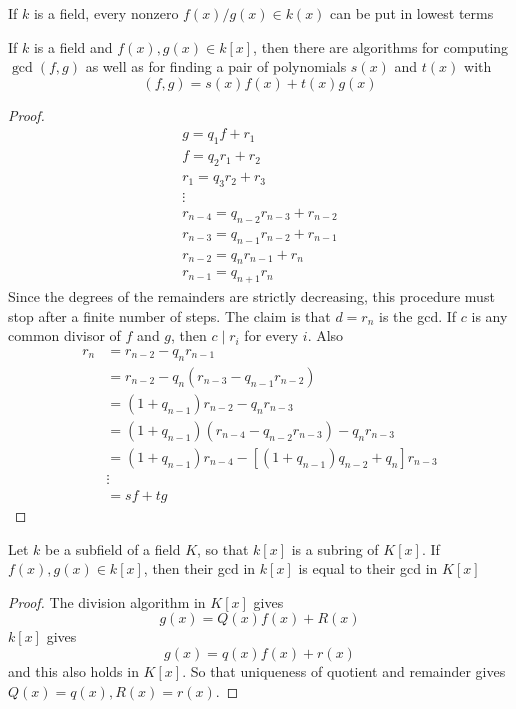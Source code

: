 \documentclass[11pt]{article}
\begin{document}
\begin{proposition}[]
If \(k\) is a field, every nonzero \(f(x)/g(x)\in k(x)\) can be put in lowest terms
\end{proposition}


\begin{theorem}
If \(k\) is a field and \(f(x),g(x)\in k[x]\), then there are algorithms for
computing \(\gcd(f,g)\) as well as for finding a pair of polynomials \(s(x)\)
and \(t(x)\) with 
\begin{equation*}
(f,g)=s(x)f(x)+t(x)g(x)
\end{equation*}
\end{theorem}

\begin{proof}
\begin{gather*}
g=q_1f+r_1\\
f=q_2r_1+r_2\\
r_1=q_3r_2+r_3\\
\vdots\\
r_{n-4}=q_{n-2}r_{n-3}+r_{n-2}\\
r_{n-3}=q_{n-1}r_{n-2}+r_{n-1}\\
r_{n-2}=q_nr_{n-1}+r_n\\
r_{n-1}=q_{n+1}r_n
\end{gather*}
Since the degrees of the remainders are strictly decreasing, this procedure
must stop after a finite number of steps. The claim is that \(d=r_n\) is the
gcd. If \(c\) is any common divisor of \(f\) and \(g\), then \(c\mid r_i\)  for every
\(i\). Also
\begin{align*}
r_n&=r_{n-2}-q_nr_{n-1}\\
&=r_{n-2}-q_n(r_{n-3}-q_{n-1}r_{n-2})\\
&=(1+q_{n-1})r_{n-2}-q_nr_{n-3}\\
&=(1+q_{n-1})(r_{n-4}-q_{n-2}r_{n-3})-q_nr_{n-3}\\
&=(1+q_{n-1})r_{n-4}-[(1+q_{n-1})q_{n-2}+q_n]r_{n-3}\\
&\vdots\\
&=sf+tg
\end{align*}
\end{proof}

\begin{corollary}[]
Let \(k\) be a subfield of a field \(K\), so that \(k[x]\) is a subring of \(K[x]\).
If \(f(x),g(x)\in k[x]\), then their gcd in \(k[x]\) is equal to their gcd in \(K[x]\)
\end{corollary}

\begin{proof}
The division algorithm in \(K[x]\) gives
\begin{equation*}
g(x)=Q(x)f(x)+R(x)
\end{equation*}
\(k[x]\) gives
\begin{equation*}
g(x)=q(x)f(x)+r(x)
\end{equation*}
and this also holds in \(K[x]\). So that uniqueness of quotient and remainder
gives \(Q(x)=q(x),R(x)=r(x)\).
\end{proof}
\end{document}
